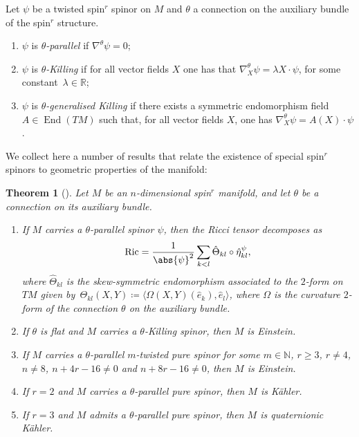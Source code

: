 \documentclass[pdftex]{sigma}
\numberwithin{equation}{section}
\newtheorem{Theorem}{Theorem}[section]
\DeclareMathOperator{\Ric}{Ric}
\DeclareMathOperator{\End}{End}
\begin{document}
		\begin{Definition}
			Let $\psi$ be a twisted spin$^r$ spinor on $M$ and $\theta$ a connection on the auxiliary bundle of the spin$^r$ structure.
			\begin{enumerate}\itemsep=0pt
				\item[(1)] $\psi$ is \textit{$\theta$-parallel} if $\nabla^{\theta} \psi = 0$;
				\item[(2)] $\psi$ is \textit{$\theta$-Killing} if for all vector fields $X$ one has that $\nabla_X^{\theta} \psi = \lambda X \cdot \psi$, for some constant~${\lambda \in \mathbb{R}}$;
				\item[(3)] $\psi$ is \textit{$\theta$-generalised Killing} if there exists a symmetric endomorphism field $A\in \End(TM)$ such that, for all vector fields $X$, one has $\nabla_X^{\theta} \psi = A(X) \cdot \psi$.
			\end{enumerate}
		\end{Definition}
		We collect here a number of results that relate the existence of special spin$^r$ spinors to geometric properties of the manifold:
		\begin{Theorem}[\cite{EH16,ES19}] \label{thm:herrera}
			Let $M$ be an $n$-dimensional spin$^r$ manifold, and let $\theta$ be a connection on its auxiliary bundle.
			\begin{enumerate}\itemsep=0pt
				\item[$(1)$] If $M$ carries a $\theta$-parallel spinor $\psi$, then the Ricci tensor decomposes as
				\begin{equation*}
					\Ric = \frac{1}{\abs{\psi}^2} \sum_{k < l} \hat{\Theta}_{kl} \circ \hat{\eta}_{kl}^{\psi} ,
				\end{equation*}
				where $\hat{\Theta}_{kl}$ is the skew-symmetric endomorphism associated to the $2$-form on $TM$ given by~${
				\Theta_{kl} (X,Y) \coloneqq \langle \Omega(X,Y) ( \hat{e}_k ) , \hat{e}_l \rangle } $,
				where $\Omega$ is the curvature $2$-form of the connection $\theta$ on the auxiliary bundle.
				\item[$(2)$] If $\theta$ is flat and $M$ carries a $\theta$-Killing spinor, then $M$ is Einstein.
				\item[$(3)$] If $M$ carries a $\theta$-parallel $m$-twisted pure spinor for some $m \in \mathbb{N}$, $r \geq 3$, $r \neq 4$, $n \neq 8$, $n + 4r - 16 \neq 0$ and $n + 8r - 16 \neq 0$, then $M$ is Einstein.
				\item[$(4)$] If $r=2$ and $M$ carries a $\theta$-parallel pure spinor, then $M$ is K\"{a}hler.
				\item[$(5)$] If $r=3$ and $M$ admits a $\theta$-parallel pure spinor, then $M$ is quaternionic K\"{a}hler.
			\end{enumerate}
		\end{Theorem}
		
\end{document}
